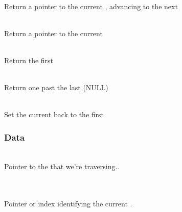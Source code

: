 \documentclass[11pt]{article}
\begin{document}
     \\
    Return a pointer to the current , advancing to the next 

     \\
    Return a pointer to the current 

     \\
    Return the first 

     \\
    Return one past the last  (NULL)

     \\
    Set the current  back to the first 


\subsubsection{ Data}

     \\
    Pointer to the  that we're traversing..

     \\
     \\
    Pointer or index identifying the current .
\end{document}
